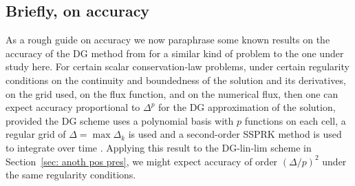 \subsection{Briefly, on accuracy}
As a rough guide on accuracy we now paraphrase some known results on the accuracy of the DG method from \cite[Sections~5.5,~5.8]{nodalDGBook} for a similar kind of problem to the one under study here. For certain scalar conservation-law problems, under certain regularity conditions on the continuity and boundedness of the solution and its derivatives, on the grid used, on the flux function, and on the numerical flux, then one can expect accuracy proportional to \(\Delta^{p}\) for the DG approximation of the solution, provided the DG scheme uses a polynomial basis with \(p\) functions on each cell, a regular grid of \(\Delta = \max \Delta_k\) is used and a second-order SSPRK method is used to integrate over time \citep[Sections~5.5,~5.8, and references therein]{nodalDGBook}. Applying this result to the DG-lin-lim scheme in Section~\ref{sec: anoth pos pres}, we might expect accuracy of order \((\Delta/p)^2\) under the same regularity conditions.




